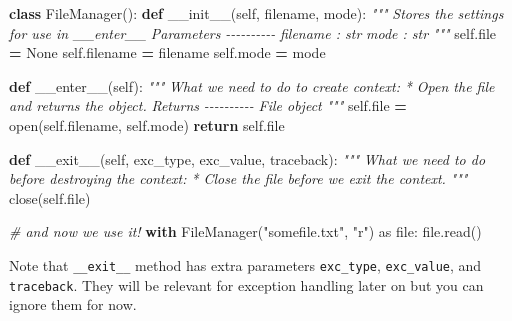 \documentclass[
]{book}
\newenvironment{Shaded}{\begin{snugshade}}{\end{snugshade}}
\newcommand{\BuiltInTok}[1]{#1}
\newcommand{\CommentTok}[1]{\textcolor[rgb]{0.56,0.35,0.01}{\textit{#1}}}
\newcommand{\ControlFlowTok}[1]{\textcolor[rgb]{0.13,0.29,0.53}{\textbf{#1}}}
\newcommand{\FunctionTok}[1]{\textcolor[rgb]{0.00,0.00,0.00}{#1}}
\newcommand{\ImportTok}[1]{#1}
\newcommand{\KeywordTok}[1]{\textcolor[rgb]{0.13,0.29,0.53}{\textbf{#1}}}
\newcommand{\NormalTok}[1]{#1}
\newcommand{\OperatorTok}[1]{\textcolor[rgb]{0.81,0.36,0.00}{\textbf{#1}}}
\newcommand{\StringTok}[1]{\textcolor[rgb]{0.31,0.60,0.02}{#1}}
\newcommand{\VariableTok}[1]{\textcolor[rgb]{0.00,0.00,0.00}{#1}}
\begin{document}
\begin{Shaded}
\begin{Highlighting}[]
\KeywordTok{class}\NormalTok{ FileManager():}
    \KeywordTok{def} \FunctionTok{\_\_init\_\_}\NormalTok{(}\VariableTok{self}\NormalTok{, filename, mode):}
        \CommentTok{"""}
\CommentTok{        Stores the settings for use in \_\_enter\_\_}
\CommentTok{        }
\CommentTok{        Parameters}
\CommentTok{        {-}{-}{-}{-}{-}{-}{-}{-}{-}{-}}
\CommentTok{        filename : str}
\CommentTok{        mode : str}
\CommentTok{        """}
        \VariableTok{self}\NormalTok{.}\BuiltInTok{file} \OperatorTok{=} \VariableTok{None}
        \VariableTok{self}\NormalTok{.filename }\OperatorTok{=}\NormalTok{ filename}
        \VariableTok{self}\NormalTok{.mode }\OperatorTok{=}\NormalTok{ mode}
        
    \KeywordTok{def} \FunctionTok{\_\_enter\_\_}\NormalTok{(}\VariableTok{self}\NormalTok{):}
      \CommentTok{""" }
\CommentTok{      What we need to do to create context:}
\CommentTok{        * Open the file and returns the object.}
\CommentTok{      }
\CommentTok{      Returns}
\CommentTok{      {-}{-}{-}{-}{-}{-}{-}{-}{-}{-}}
\CommentTok{      File object}
\CommentTok{      """}
      \VariableTok{self}\NormalTok{.}\BuiltInTok{file} \OperatorTok{=} \BuiltInTok{open}\NormalTok{(}\VariableTok{self}\NormalTok{.filename, }\VariableTok{self}\NormalTok{.mode)}
      \ControlFlowTok{return} \VariableTok{self}\NormalTok{.}\BuiltInTok{file}
      
    \KeywordTok{def} \FunctionTok{\_\_exit\_\_}\NormalTok{(}\VariableTok{self}\NormalTok{, exc\_type, exc\_value, traceback):}
      \CommentTok{"""}
\CommentTok{      What we need to do before destroying the context:}
\CommentTok{        * Close the file before we exit the context.}
\CommentTok{      """}
\NormalTok{      close(}\VariableTok{self}\NormalTok{.}\BuiltInTok{file}\NormalTok{)}
      
\CommentTok{\# and now we use it!}
\ControlFlowTok{with}\NormalTok{ FileManager(}\StringTok{"somefile.txt"}\NormalTok{, }\StringTok{"r"}\NormalTok{) }\ImportTok{as} \BuiltInTok{file}\NormalTok{:}
    \BuiltInTok{file}\NormalTok{.read()}
\end{Highlighting}
\end{Shaded}

Note that \texttt{\_\_exit\_\_} method has extra parameters \texttt{exc\_type}, \texttt{exc\_value}, and \texttt{traceback}. They will be relevant for exception handling later on but you can ignore them for now.
\end{document}
